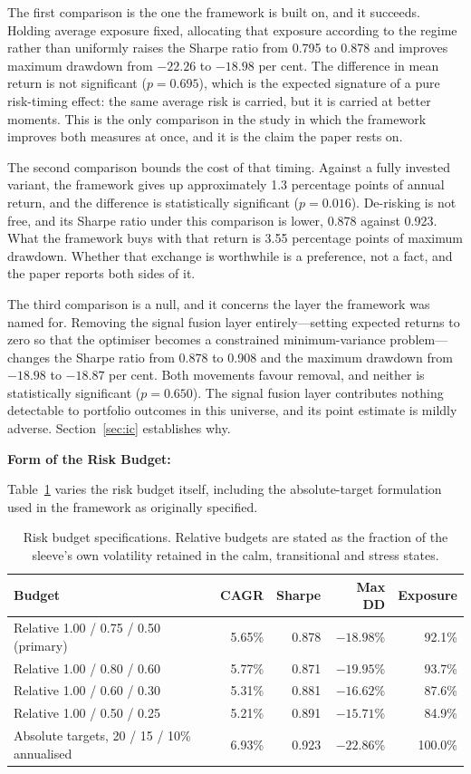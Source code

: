 The first comparison is the one the framework is built on, and it succeeds. Holding
average exposure fixed, allocating that exposure according to the regime rather than
uniformly raises the Sharpe ratio from 0.795 to 0.878 and improves maximum drawdown from
$-22.26$ to $-18.98$ per cent. The difference in mean return is not significant
($p = 0.695$), which is the expected signature of a pure risk-timing effect: the same
average risk is carried, but it is carried at better moments. This is the only comparison
in the study in which the framework improves both measures at once, and it is the claim
the paper rests on.

The second comparison bounds the cost of that timing. Against a fully invested variant,
the framework gives up approximately 1.3 percentage points of annual return, and the
difference is statistically significant ($p = 0.016$). De-risking is not free, and its
Sharpe ratio under this comparison is lower, 0.878 against 0.923. What the framework buys
with that return is 3.55 percentage points of maximum drawdown. Whether that exchange is
worthwhile is a preference, not a fact, and the paper reports both sides of it.

The third comparison is a null, and it concerns the layer the framework was named for.
Removing the signal fusion layer entirely---setting expected returns to zero so that the
optimiser becomes a constrained minimum-variance problem---changes the Sharpe ratio from
0.878 to 0.908 and the maximum drawdown from $-18.98$ to $-18.87$ per cent. Both
movements favour removal, and neither is statistically significant ($p = 0.650$). The
signal fusion layer contributes nothing detectable to portfolio outcomes in this
universe, and its point estimate is mildly adverse. Section~\ref{sec:ic} establishes why.

\textbf{Form of the Risk Budget:}

Table~\ref{tab:budget} varies the risk budget itself, including the absolute-target
formulation used in the framework as originally specified.

\begin{table}[!ht]
\centering
\caption{Risk budget specifications. Relative budgets are stated as the fraction of the
sleeve's own volatility retained in the calm, transitional and stress states.}
\label{tab:budget}
\footnotesize
\begin{tabular}{p{4.6cm}rrrr}
\hline
\textbf{Budget} & \textbf{CAGR} & \textbf{Sharpe} & \textbf{Max DD} & \textbf{Exposure} \\
\hline
Relative 1.00 / 0.75 / 0.50 (primary) & 5.65\% & 0.878 & $-18.98$\% & 92.1\% \\
Relative 1.00 / 0.80 / 0.60 & 5.77\% & 0.871 & $-19.95$\% & 93.7\% \\
Relative 1.00 / 0.60 / 0.30 & 5.31\% & 0.881 & $-16.62$\% & 87.6\% \\
Relative 1.00 / 0.50 / 0.25 & 5.21\% & 0.891 & $-15.71$\% & 84.9\% \\
Absolute targets, 20 / 15 / 10\% annualised & 6.93\% & 0.923 & $-22.86$\% & 100.0\% \\
\hline
\end{tabular}
\end{table}


